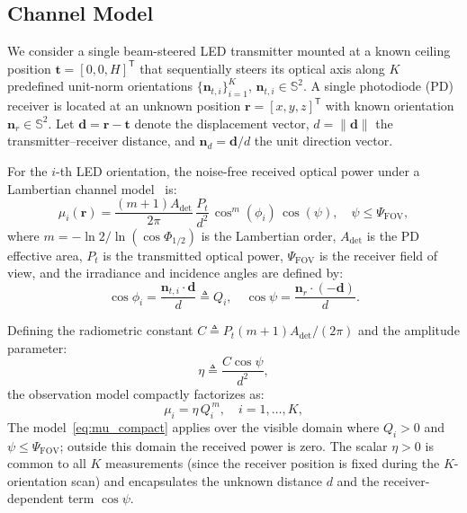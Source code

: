 \documentclass[conference]{IEEEtran}
\begin{document}
\subsection{Channel Model}
\label{subsec:channel}

We consider a single beam-steered LED transmitter mounted at a known ceiling position $\mathbf{t}=[0,0,H]^{\mathsf T}$ that sequentially steers its optical axis along $K$ predefined unit-norm orientations $\{\mathbf{n}_{t,i}\}_{i=1}^K$, $\mathbf{n}_{t,i}\in\mathbb{S}^2$.
A single photodiode (PD) receiver is located at an unknown position $\mathbf{r}=[x,y,z]^{\mathsf T}$ with known orientation $\mathbf{n}_r\in\mathbb{S}^2$.
Let $\mathbf{d}=\mathbf{r}-\mathbf{t}$ denote the displacement vector, $d=\lVert\mathbf{d}\rVert$ the transmitter--receiver distance, and $\mathbf{n}_d=\mathbf{d}/d$ the unit direction vector.

For the $i$-th LED orientation, the noise-free received optical power under a Lambertian channel model~\cite{Kahn1997} is:
\begin{equation}
\mu_i(\mathbf{r}) = \frac{(m+1)A_{\mathrm{det}}}{2\pi}\,\frac{P_t}{d^2}\,\cos^m(\phi_i)\,\cos(\psi), \quad \psi\leq\Psi_{\mathrm{FOV}},
\label{eq:mu_full}
\end{equation}
where $m=-\ln 2/\ln(\cos\Phi_{1/2})$ is the Lambertian order, $A_{\mathrm{det}}$ is the PD effective area, $P_t$ is the transmitted optical power, $\Psi_{\mathrm{FOV}}$ is the receiver field of view, and the irradiance and incidence angles are defined by:
\begin{equation}
\cos\phi_i = \frac{\mathbf{n}_{t,i}\cdot\mathbf{d}}{d} \triangleq Q_i, \quad
\cos\psi = \frac{\mathbf{n}_r\cdot(-\mathbf{d})}{d}.
\label{eq:angles}
\end{equation}

Defining the radiometric constant $C\triangleq P_t(m+1)A_{\mathrm{det}}/(2\pi)$ and the amplitude parameter:
\begin{equation}
\eta \triangleq \frac{C\cos\psi}{d^2},
\label{eq:eta_def}
\end{equation}
the observation model compactly factorizes as:
\begin{equation}
\mu_i = \eta\,Q_i^{\,m}, \quad i=1,\ldots,K,
\label{eq:mu_compact}
\end{equation}
The model~\eqref{eq:mu_compact} applies over the visible domain where $Q_i>0$ and $\psi\leq\Psi_{\mathrm{FOV}}$; outside this domain the received power is zero.
The scalar $\eta>0$ is common to all $K$ measurements (since the receiver position is fixed during the $K$-orientation scan) and encapsulates the unknown distance $d$ and the receiver-dependent term $\cos\psi$.
\end{document}
